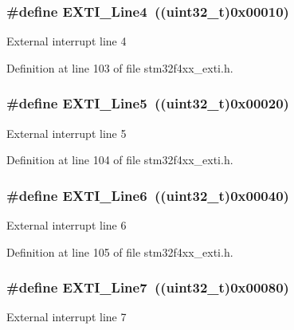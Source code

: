 \hypertarget{group___e_x_t_i___lines_gab33b1fe19306e9e60f8f8d0928b800be}{
\subsubsection[{E\-X\-T\-I\-\_\-\-Line4}]{\setlength{\rightskip}{0pt plus 5cm}\#define E\-X\-T\-I\-\_\-\-Line4~((uint32\-\_\-t)0x00010)}}\label{group___e_x_t_i___lines_gab33b1fe19306e9e60f8f8d0928b800be}
External interrupt line 4 

Definition at line 103 of file stm32f4xx\-\_\-exti.\-h.

\hypertarget{group___e_x_t_i___lines_ga6b4c6292e3abd521cab2bf99d37a15c6}{
\subsubsection[{E\-X\-T\-I\-\_\-\-Line5}]{\setlength{\rightskip}{0pt plus 5cm}\#define E\-X\-T\-I\-\_\-\-Line5~((uint32\-\_\-t)0x00020)}}\label{group___e_x_t_i___lines_ga6b4c6292e3abd521cab2bf99d37a15c6}
External interrupt line 5 

Definition at line 104 of file stm32f4xx\-\_\-exti.\-h.

\hypertarget{group___e_x_t_i___lines_ga97a5145d1d2612dd53bdd9db3d366873}{
\subsubsection[{E\-X\-T\-I\-\_\-\-Line6}]{\setlength{\rightskip}{0pt plus 5cm}\#define E\-X\-T\-I\-\_\-\-Line6~((uint32\-\_\-t)0x00040)}}\label{group___e_x_t_i___lines_ga97a5145d1d2612dd53bdd9db3d366873}
External interrupt line 6 

Definition at line 105 of file stm32f4xx\-\_\-exti.\-h.

\hypertarget{group___e_x_t_i___lines_ga3b7155d54a4a98394b599718901ccbe5}{
\subsubsection[{E\-X\-T\-I\-\_\-\-Line7}]{\setlength{\rightskip}{0pt plus 5cm}\#define E\-X\-T\-I\-\_\-\-Line7~((uint32\-\_\-t)0x00080)}}\label{group___e_x_t_i___lines_ga3b7155d54a4a98394b599718901ccbe5}
External interrupt line 7 

